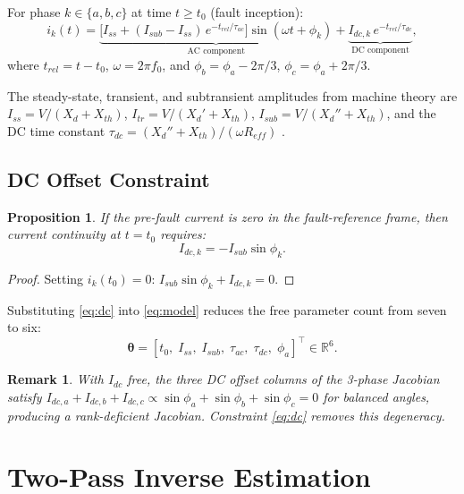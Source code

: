 \documentclass[journal, twoside, 10pt]{IEEEtran}
\newtheorem{proposition}{Proposition}
\newtheorem{remark}{Remark}
\newcommand{\vect}[1]{\bm{#1}}
\begin{document}
For phase $k \in \{a,b,c\}$ at time $t \geq t_0$ (fault inception):
\begin{equation}
  i_k(t) = \underbrace{\bigl[I_{ss} + (I_{sub}-I_{ss})\,e^{-t_{rel}/\tau_{ac}}
            \bigr]\sin(\omega t+\phi_k)}_{\text{AC component}}
          + \underbrace{I_{dc,k}\,e^{-t_{rel}/\tau_{dc}}}_{\text{DC component}},
  \label{eq:model}
\end{equation}
where $t_{rel} = t - t_0$, $\omega = 2\pi f_0$, and
$\phi_b = \phi_a - 2\pi/3$, $\phi_c = \phi_a + 2\pi/3$.

The steady-state, transient, and subtransient amplitudes from machine theory
are $I_{ss} = V/(X_d{+}X_{th})$, $I_{tr} = V/(X_d'{+}X_{th})$,
$I_{sub} = V/(X_d''{+}X_{th})$, and the DC time constant
$\tau_{dc} = (X_d''+X_{th})/(\omega R_{eff})$ \cite{IEEE1110}.

\subsection{DC Offset Constraint}
\label{sec:dc}

\begin{proposition}
If the pre-fault current is zero in the fault-reference frame, then
current continuity at $t = t_0$ requires:
\begin{equation}
  I_{dc,k} = -I_{sub}\sin\phi_k.
  \label{eq:dc}
\end{equation}
\end{proposition}
\begin{proof}
Setting $i_k(t_0) = 0$: $I_{sub}\sin\phi_k + I_{dc,k} = 0$.
\end{proof}

\noindent
Substituting \eqref{eq:dc} into \eqref{eq:model} reduces the free parameter
count from seven to six:
\begin{equation}
  \vect{\theta} = [t_0,\;I_{ss},\;I_{sub},\;\tau_{ac},\;\tau_{dc},\;\phi_a]^\top
  \in \mathbb{R}^6.
  \label{eq:theta}
\end{equation}

\begin{remark}
With $I_{dc}$ free, the three DC offset columns of the 3-phase Jacobian satisfy
$I_{dc,a}+I_{dc,b}+I_{dc,c} \propto \sin\phi_a+\sin\phi_b+\sin\phi_c = 0$
for balanced angles, producing a rank-deficient Jacobian.
Constraint \eqref{eq:dc} removes this degeneracy.
\end{remark}

\section{Two-Pass Inverse Estimation}
\label{sec:estimation}
\end{document}
